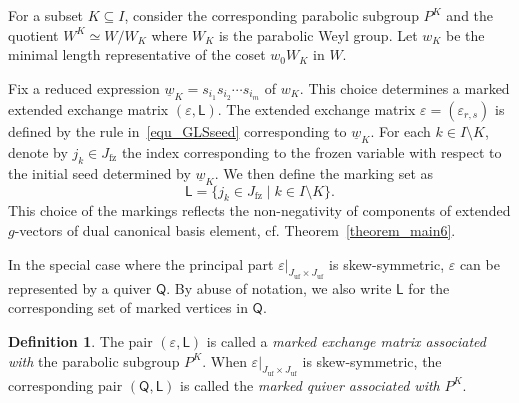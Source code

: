 \documentclass[11pt]{amsart}
\numberwithin{equation}{section}
\theoremstyle{plain}
\theoremstyle{definition}
\newtheorem{definition}[theorem]{Definition}
\numberwithin{equation}{section}
\begin{document}
For a subset $K \subseteq I$, consider the corresponding parabolic subgroup $P^K$ and the quotient $W^K \simeq W / W_K$ where $W_K$ is the parabolic Weyl group. Let $w_K$ be the minimal length representative of the coset $w_0 W_K$ in $W$. 

Fix a reduced expression $\underline{w}_K = s_{i_1} s_{i_2} \cdots s_{i_m}$ of ${w}_K$. This choice determines a marked extended exchange matrix $(\varepsilon, \mathsf{L})$. The extended exchange matrix $\varepsilon = (\varepsilon_{r,s})$ is defined by the rule in~\eqref{equ_GLSseed} corresponding to $\underline{w}_K$. For each $k \in I \setminus K$, denote by $j_k \in J_\mathrm{fz}$ the index corresponding to the frozen variable with respect to the initial seed determined by $\underline{w}_K$. We then define the marking set as 
\begin{equation}\label{equ_labelL}
\mathsf{L} = \{ j_k \in J_\mathrm{fz} \mid k \in I \setminus K \}.
\end{equation}
This choice of the markings reflects the non-negativity of components of extended $g$-vectors of dual canonical basis element, cf. Theorem~\ref{theorem_main6}.

In the special case where the principal part $\varepsilon |_{J_\mathrm{uf} \times J_\mathrm{uf}}$ is skew-symmetric, $\varepsilon$ can be represented by a quiver $\mathsf{Q}$. By abuse of notation, we also write $\mathsf{L}$ for the corresponding set of marked vertices in $\mathsf{Q}$.

\begin{definition}\label{def_labeledexcmatass}
The pair $(\varepsilon, \mathsf{L})$ is called a \emph{marked exchange matrix associated with} the parabolic subgroup $P^K$. When $\varepsilon |_{J_\mathrm{uf} \times J_\mathrm{uf}}$ is skew-symmetric, the corresponding pair $(\mathsf{Q}, \mathsf{L})$ is called the \emph{marked quiver associated with} $P^K$.
\end{definition}
\end{document}
